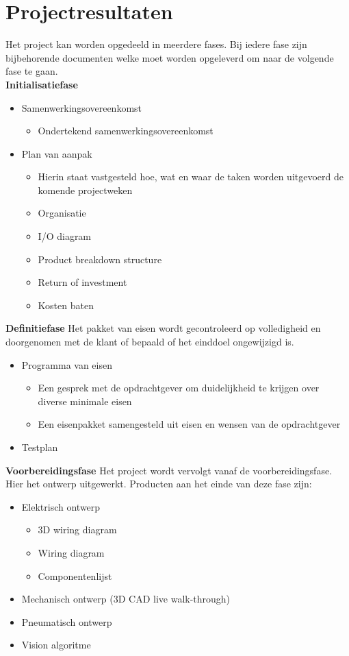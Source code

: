 \section{Projectresultaten}
Het project kan worden opgedeeld in meerdere fases. Bij iedere fase zijn bijbehorende documenten welke moet worden opgeleverd om naar de volgende fase te gaan. \\[0.5cm]

\textbf{Initialisatiefase}


\begin{itemize}
	\item Samenwerkingsovereenkomst
	\begin{itemize}
		\item Ondertekend samenwerkingsovereenkomst
	\end{itemize}
	\item Plan van aanpak
	\begin{itemize}
		\item Hierin staat vastgesteld hoe, wat en waar de taken worden uitgevoerd de komende projectweken
		\item Organisatie
		\item I/O diagram
		\item Product breakdown structure
		\item Return of investment
		\item Kosten baten
	\end{itemize}
\end{itemize}


\textbf{Definitiefase}
Het pakket van eisen wordt gecontroleerd op volledigheid en doorgenomen met de klant of bepaald of het einddoel ongewijzigd is. 

\begin{itemize}
	\item Programma van eisen
	\begin{itemize}
		\item Een gesprek met de opdrachtgever om duidelijkheid te krijgen over diverse minimale eisen
		\item Een eisenpakket samengesteld uit eisen en wensen van de opdrachtgever
	\end{itemize}
	\item Testplan
\end{itemize}

\textbf{Voorbereidingsfase}
Het project wordt vervolgt vanaf de voorbereidingsfase. Hier het ontwerp uitgewerkt. Producten aan het einde van deze fase zijn:\\
\begin{itemize}
	\item Elektrisch ontwerp
	\begin{itemize}
		\item 3D wiring diagram
		\item Wiring diagram
		\item Componentenlijst
	\end{itemize}
	\item Mechanisch ontwerp (3D CAD live walk-through)
	\item Pneumatisch ontwerp
	\item Vision algoritme
\end{itemize}

